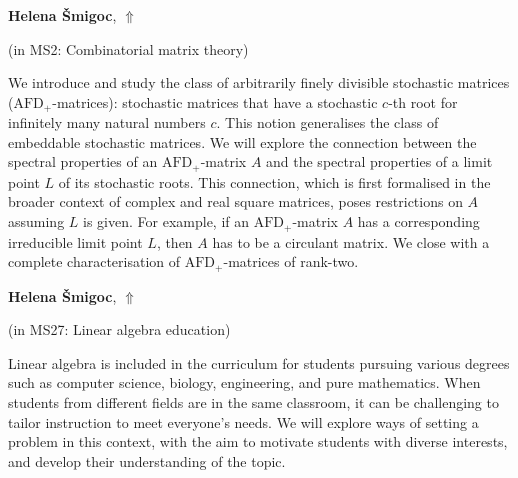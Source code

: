 \documentclass[ILAS2025-program.tex]{subfiles}
\begin{document}
\hypertarget{down0263}{}\begin{ilasabstract}
    
\textbf{Helena Šmigoc},  \hfill \hyperlink{up0263}{$\Uparrow$}
    
    
(in {\color{mstitle}MS2: Combinatorial matrix theory})
        
\mtskip
    We introduce and study the class of arbitrarily finely divisible stochastic matrices ($\mathrm{AFD}_+$-matrices): stochastic matrices that have a stochastic $c$-th root for infinitely many natural numbers $c$. This notion generalises the class of embeddable stochastic matrices. 
We will explore the connection between the spectral properties of an  $\mathrm{AFD}_+$-matrix $A$ and the spectral properties of a limit point $L$ of its stochastic roots. This connection, which is first formalised in the broader context of complex and real square matrices, poses restrictions on $A$ assuming $L$ is given. For example, if an $\mathrm{AFD}_+$-matrix $A$ has a corresponding irreducible limit point $L$, then $A$ has to be a circulant matrix. We close with a complete characterisation of $\mathrm{AFD}_+$-matrices of rank-two.
\end{ilasabstract}
    

\hypertarget{down0331}{}\begin{ilasabstract}
    
\textbf{Helena Šmigoc},  \hfill \hyperlink{up0331}{$\Uparrow$}
    
    
(in {\color{mstitle}MS27: Linear algebra education})
        
\mtskip
    Linear algebra is included in the curriculum for students pursuing various degrees such as computer science, biology, engineering, and pure mathematics. When students from different fields are in the same classroom, it can be challenging to tailor instruction to meet everyone's needs.  We will explore ways of setting a problem in this context, with the aim to motivate students with diverse interests, and  develop their understanding of the topic.

\end{ilasabstract}
    
\end{document}
